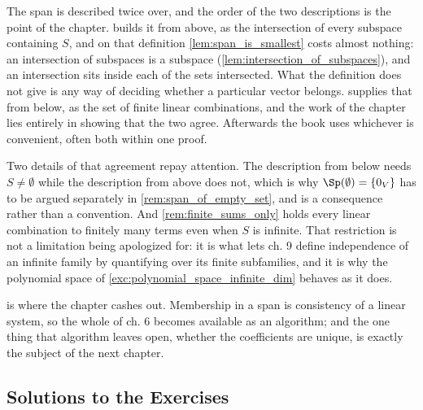 \begin{ainote}
The span is described twice over, and the order of the two descriptions is the
point of the chapter.  builds it from above, as the intersection
of every subspace containing $S$, and on that definition
\cref{lem:span_is_smallest} costs almost nothing: an intersection of subspaces
is a subspace (\cref{lem:intersection_of_subspaces}), and an intersection sits
inside each of the sets intersected. What the definition does not give is any
way of deciding whether a particular vector belongs.
 supplies that from below, as the set of
finite linear combinations, and the work of the chapter lies entirely in showing
that the two agree. Afterwards the book uses whichever is convenient, often both
within one proof.

Two details of that agreement repay attention. The description from below needs
$S \ne \emptyset$ while the description from above does not, which is why
$\Sp(\emptyset) = \{0_V\}$ has to be argued separately in
\cref{rem:span_of_empty_set}, and is a consequence rather than a convention.
And \cref{rem:finite_sums_only} holds every linear combination to finitely many
terms even when $S$ is infinite. That restriction is not a limitation being
apologized for: it is what lets ch. 9 define independence of an infinite family
by quantifying over its finite subfamilies, and it is why the polynomial space
of \cref{exc:polynomial_space_infinite_dim} behaves as it does.

 is where the chapter cashes out. Membership in a
span is consistency of a linear system, so the whole of ch. 6 becomes available
as an algorithm; and the one thing that algorithm leaves open, whether the
coefficients are unique, is exactly the subject of the next chapter.
\end{ainote}

\subsection{Solutions to the Exercises}
\label{sec:solutions_span}

